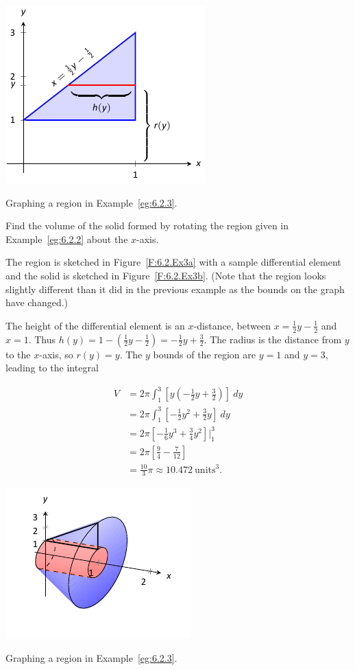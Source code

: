 \begin{marginfigure}[6cm] %
\includegraphics{figures/figshell3a}
\caption{Graphing a region in Example~\ref{eg:6.2.3}.} \label{F:6.2.Ex3a}
\end{marginfigure}

\begin{example} \label{eg:6.2.3} %
Find the volume of the solid formed by rotating the region given in Example~\ref{eg:6.2.2} about the $x$-axis.

\solution
The region is sketched in Figure~\ref{F:6.2.Ex3a} with a sample differential element and the solid is sketched in Figure~\ref{F:6.2.Ex3b}. (Note that the region looks slightly different than it did in the previous example as the bounds on the graph have changed.)

The height of the differential element is an $x$-distance, between $x=\frac12y-\frac12$ and $x=1$. Thus $h(y) = 1-(\frac12y-\frac12) = -\frac12y+\frac32.$ The radius is the distance from $y$ to the $x$-axis, so $r(y) =y$. The $y$ bounds of the region are $y=1$ and $y=3$, leading to the integral

\begin{align*}
V &= 2\pi\int_1^3\left[y\left(-\frac12y+\frac32\right)\right]\ dy \\
	&= 2\pi\int_1^3\left[-\frac12y^2+\frac32y\right]\ dy \\
	&= 2\pi\left[-\frac16y^3+\frac34y^2\right]\Big|_1^3 \\
	&= 2\pi\left[\frac94-\frac7{12}\right]\\
	&=	\frac{10}{3}\pi \approx 10.472\ \text{units}^3.
\end{align*}
\end{example}

\begin{marginfigure}[-6cm] %
\includegraphics{figures/figshell3b}
\caption{Graphing a region in Example~\ref{eg:6.2.3}.} \label{F:6.2.Ex3b}
\end{marginfigure}